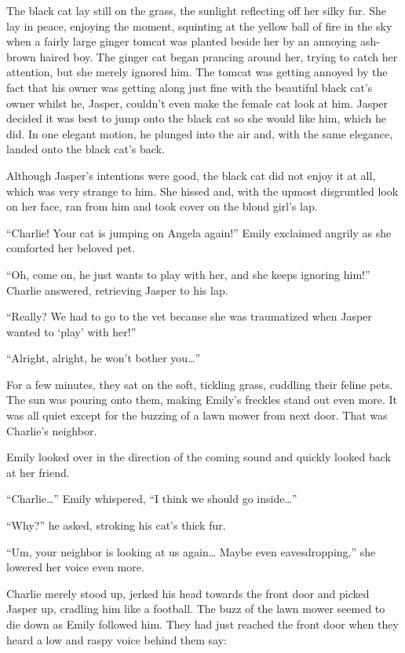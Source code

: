 The black cat lay still on the grass, the sunlight reflecting off her silky fur. She lay in peace, enjoying the moment, squinting at the yellow ball of fire in the sky when a fairly large ginger tomcat was planted beside her by an annoying ash-brown haired boy. The ginger cat began prancing around her, trying to catch her attention, but she merely ignored him. The tomcat was getting annoyed by the fact that his owner was getting along just fine with the beautiful black cat’s owner whilst he, Jasper, couldn’t even make the female cat look at him. Jasper decided it was best to jump onto the black cat so she would like him, which he did. In one elegant motion, he plunged into the air and, with the same elegance, landed onto the black cat’s back.

Although Jasper’s intentions were good, the black cat did not enjoy it at all, which was very strange to him. She hissed and, with the upmost disgruntled look on her face, ran from him and took cover on the blond girl’s lap.

“Charlie! Your cat is jumping on Angela again!” Emily exclaimed angrily as she comforted her beloved pet.

“Oh, come on, he just wants to play with her, and she keeps ignoring him!” Charlie answered, retrieving Jasper to his lap.

“Really? We had to go to the vet because she was traumatized when Jasper wanted to ‘play’ with her!”

“Alright, alright, he won’t bother you…”

For a few minutes, they sat on the soft, tickling grass, cuddling their feline pets. The sun was pouring onto them, making Emily’s freckles stand out even more. It was all quiet except for the buzzing of a lawn mower from next door. That was Charlie’s neighbor.

Emily looked over in the direction of the coming sound and quickly looked back at her friend.

“Charlie…” Emily whispered, “I think we should go inside…”

“Why?” he asked, stroking his cat’s thick fur.

“Um, your neighbor is looking at us again… Maybe even eavesdropping,” she lowered her voice even more.

Charlie merely stood up, jerked his head towards the front door and picked Jasper up, cradling him like a football. The buzz of the lawn mower seemed to die down as Emily followed him. They had just reached the front door when they heard a low and raspy voice behind them say:

